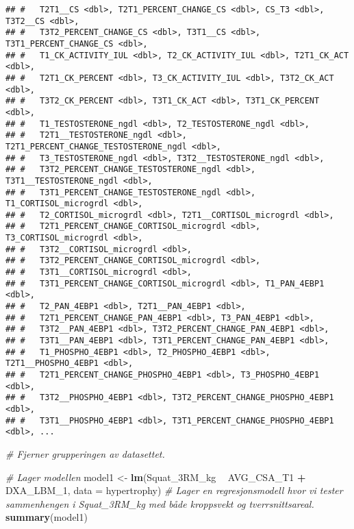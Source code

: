 \documentclass[
]{article}
\newenvironment{Shaded}{\begin{snugshade}}{\end{snugshade}}
\newcommand{\CommentTok}[1]{\textcolor[rgb]{0.56,0.35,0.01}{\textit{#1}}}
\newcommand{\DataTypeTok}[1]{\textcolor[rgb]{0.13,0.29,0.53}{#1}}
\newcommand{\DecValTok}[1]{\textcolor[rgb]{0.00,0.00,0.81}{#1}}
\newcommand{\KeywordTok}[1]{\textcolor[rgb]{0.13,0.29,0.53}{\textbf{#1}}}
\newcommand{\NormalTok}[1]{#1}
\newcommand{\OperatorTok}[1]{\textcolor[rgb]{0.81,0.36,0.00}{\textbf{#1}}}
\newcommand{\StringTok}[1]{\textcolor[rgb]{0.31,0.60,0.02}{#1}}
\begin{document}
\begin{verbatim}
## #   T2T1__CS <dbl>, T2T1_PERCENT_CHANGE_CS <dbl>, CS_T3 <dbl>, T3T2__CS <dbl>,
## #   T3T2_PERCENT_CHANGE_CS <dbl>, T3T1__CS <dbl>, T3T1_PERCENT_CHANGE_CS <dbl>,
## #   T1_CK_ACTIVITY_IUL <dbl>, T2_CK_ACTIVITY_IUL <dbl>, T2T1_CK_ACT <dbl>,
## #   T2T1_CK_PERCENT <dbl>, T3_CK_ACTIVITY_IUL <dbl>, T3T2_CK_ACT <dbl>,
## #   T3T2_CK_PERCENT <dbl>, T3T1_CK_ACT <dbl>, T3T1_CK_PERCENT <dbl>,
## #   T1_TESTOSTERONE_ngdl <dbl>, T2_TESTOSTERONE_ngdl <dbl>,
## #   T2T1__TESTOSTERONE_ngdl <dbl>, T2T1_PERCENT_CHANGE_TESTOSTERONE_ngdl <dbl>,
## #   T3_TESTOSTERONE_ngdl <dbl>, T3T2__TESTOSTERONE_ngdl <dbl>,
## #   T3T2_PERCENT_CHANGE_TESTOSTERONE_ngdl <dbl>, T3T1__TESTOSTERONE_ngdl <dbl>,
## #   T3T1_PERCENT_CHANGE_TESTOSTERONE_ngdl <dbl>, T1_CORTISOL_microgrdl <dbl>,
## #   T2_CORTISOL_microgrdl <dbl>, T2T1__CORTISOL_microgrdl <dbl>,
## #   T2T1_PERCENT_CHANGE_CORTISOL_microgrdl <dbl>, T3_CORTISOL_microgrdl <dbl>,
## #   T3T2__CORTISOL_microgrdl <dbl>,
## #   T3T2_PERCENT_CHANGE_CORTISOL_microgrdl <dbl>,
## #   T3T1__CORTISOL_microgrdl <dbl>,
## #   T3T1_PERCENT_CHANGE_CORTISOL_microgrdl <dbl>, T1_PAN_4EBP1 <dbl>,
## #   T2_PAN_4EBP1 <dbl>, T2T1__PAN_4EBP1 <dbl>,
## #   T2T1_PERCENT_CHANGE_PAN_4EBP1 <dbl>, T3_PAN_4EBP1 <dbl>,
## #   T3T2__PAN_4EBP1 <dbl>, T3T2_PERCENT_CHANGE_PAN_4EBP1 <dbl>,
## #   T3T1__PAN_4EBP1 <dbl>, T3T1_PERCENT_CHANGE_PAN_4EBP1 <dbl>,
## #   T1_PHOSPHO_4EBP1 <dbl>, T2_PHOSPHO_4EBP1 <dbl>, T2T1__PHOSPHO_4EBP1 <dbl>,
## #   T2T1_PERCENT_CHANGE_PHOSPHO_4EBP1 <dbl>, T3_PHOSPHO_4EBP1 <dbl>,
## #   T3T2__PHOSPHO_4EBP1 <dbl>, T3T2_PERCENT_CHANGE_PHOSPHO_4EBP1 <dbl>,
## #   T3T1__PHOSPHO_4EBP1 <dbl>, T3T1_PERCENT_CHANGE_PHOSPHO_4EBP1 <dbl>, ...
\end{verbatim}

\begin{Shaded}
\begin{Highlighting}[]
  \CommentTok{# Fjerner grupperingen av datasettet.}

\CommentTok{# Lager modellen}
\NormalTok{model1 <-}\StringTok{ }\KeywordTok{lm}\NormalTok{(Squat_3RM_kg }\OperatorTok{~}\StringTok{ }\NormalTok{AVG_CSA_T1 }\OperatorTok{+}\StringTok{ }\NormalTok{DXA_LBM_}\DecValTok{1}\NormalTok{, }\DataTypeTok{data =}\NormalTok{ hypertrophy) }\CommentTok{# Lager en regresjonsmodell hvor vi tester sammenhengen i Squat_3RM_kg med både kroppsvekt og tverrsnittsareal.}
\KeywordTok{summary}\NormalTok{(model1)}
\end{Highlighting}
\end{Shaded}
\end{document}
